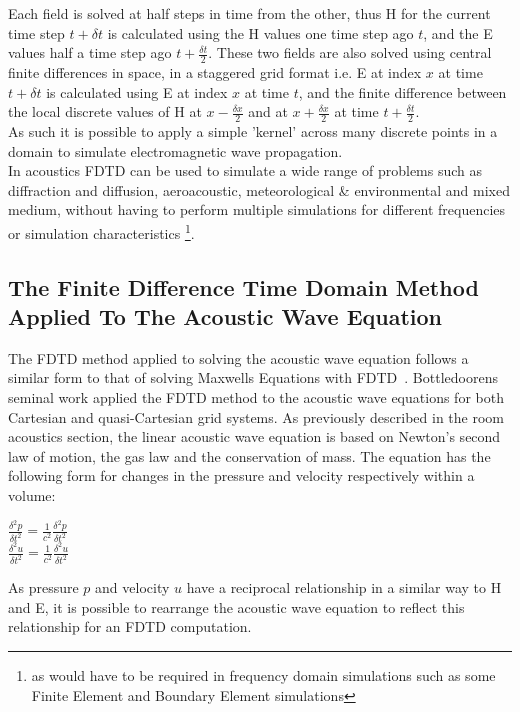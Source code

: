 Each field is solved at half steps in time from the other, thus H for the current time step $t + \delta t$ is calculated using the H values one time step ago $t$, and the E values half a time step ago $t + \frac{\delta t}{2} $. These two fields are also solved using central finite differences in space, in a staggered grid format i.e. E at index $x$ at time $t + \delta t$ is calculated using E at index $x$ at time $t$, and the finite difference between the local discrete values of H at $x - \frac{\delta x}{2} $ and at $x + \frac{\delta x}{2} $ at time $t + \frac{\delta t}{2}$.\\

As such it is possible to apply a simple 'kernel' across many discrete points in a domain to simulate electromagnetic wave propagation.\\
In acoustics FDTD can be used to simulate a wide range of problems such as diffraction and diffusion, aeroacoustic, meteorological \& environmental and mixed medium, without having to perform multiple simulations for different frequencies or simulation characteristics \footnote{as would have to be required in frequency domain simulations such as some Finite Element and Boundary Element simulations}. 

\subsection{The Finite Difference Time Domain Method Applied To The Acoustic Wave Equation}
The FDTD method applied to solving the acoustic wave equation follows a similar form to that of solving Maxwells Equations with FDTD~\cite{Schneider2015}. Bottledoorens~\cite{Botteldooren1993} seminal work applied the FDTD method to the acoustic wave equations for both Cartesian and quasi-Cartesian grid systems. As previously described in the room acoustics section, the linear acoustic wave equation is based on Newton's second law of motion, the gas law and the conservation of mass. The equation has the following form for changes in the pressure and velocity respectively within a volume:\\
\begin{center}
$\frac{\delta^2 p}{\delta t^2} = \frac{1}{c^2} \frac{\delta^2 p}{\delta t^2}$\\
$\frac{\delta^2 u}{\delta t^2} = \frac{1}{c^2} \frac{\delta^2 u}{\delta t^2}$\\
\end{center}
As pressure $p$ and velocity $u$ have a reciprocal relationship in a similar way to H and E, it is possible to rearrange the acoustic wave equation to reflect this relationship for an FDTD computation.

